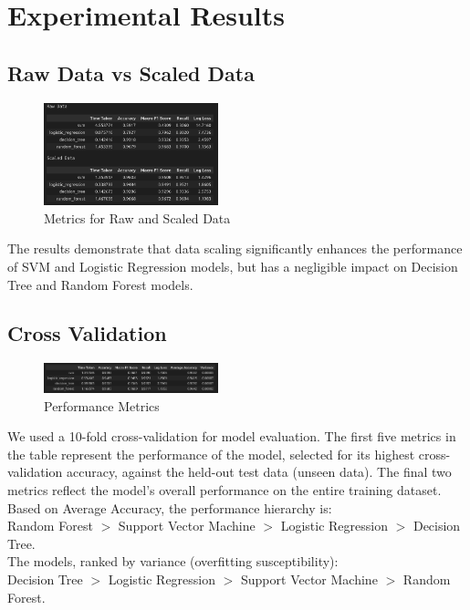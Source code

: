 \section{Experimental Results}
\subsection{Raw Data vs Scaled Data}
\begin{figure}[ht!]
    \centering
    \includegraphics[width = 0.45\textwidth]{./images/raw_vs_scaled.png}
    \caption{Metrics for Raw and Scaled Data}
    \label{fig:3}
\end{figure}
The results demonstrate that data scaling significantly enhances the performance of SVM and Logistic Regression models, but has a negligible impact on Decision Tree and Random Forest models.
\subsection{Cross Validation}
\begin{figure}[ht!]
    \centering
    \includegraphics[width = 0.45\textwidth]{./images/k_fold.png}
    \caption{Performance Metrics}
    \label{fig:4}
\end{figure}
We used a 10-fold cross-validation for model evaluation. The first five metrics in the table represent the performance of the model, selected for its highest cross-validation accuracy, against the held-out test data (unseen data). The final two metrics reflect the model's overall performance on the entire training dataset.\\
Based on Average Accuracy, the performance hierarchy is:\\
Random Forest $>$ Support Vector Machine $>$ Logistic Regression $>$ Decision Tree.\\
The models, ranked by variance (overfitting susceptibility): \\
Decision Tree $>$ Logistic Regression $>$ Support Vector Machine $>$ Random Forest.

